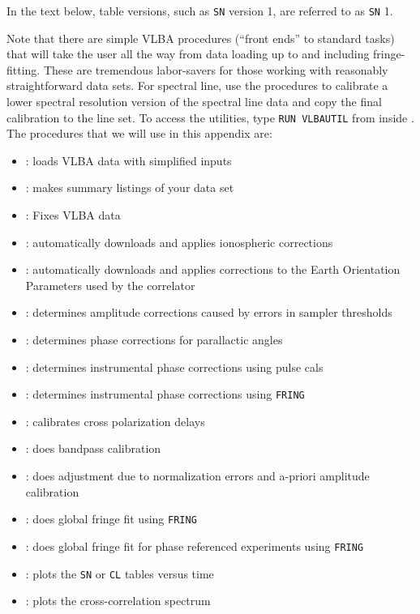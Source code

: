 In the text below, table versions, such as {\tt SN} version 1, are
referred to as {\tt SN} 1.


Note that there are simple VLBA procedures (``front ends'' to standard
tasks) that will take the user all the way from data loading up to and
including fringe-fitting.  These are tremendous labor-savers for those
working with reasonably straightforward data sets.  For spectral line,
use the procedures to calibrate a lower spectral resolution version of
the spectral line data and copy the final calibration to the line set.
To access the utilities, type {\tt RUN VLBAUTIL} from inside \AIPS\@.
The procedures that we will use in this appendix are:

\begin{itemize}
\item {{\tt {}}: loads VLBA data with simplified inputs}
\item {{\tt {}}: makes summary listings of your data set}
\item {{\tt {}}: Fixes VLBA data}
\item {{\tt {}}: automatically downloads and applies ionospheric
           corrections}
\item {{\tt {}}: automatically downloads and applies corrections
           to the Earth Orientation Parameters used by the
           correlator}
\item {{\tt {}}: determines amplitude corrections caused by
           errors in sampler thresholds}
\item {{\tt {}}: determines phase corrections for parallactic
           angles}
\item {{\tt {}}: determines instrumental phase corrections using
           pulse cals}
\item {{\tt {}}: determines instrumental phase corrections using
           {\tt FRING}}
\item {{\tt {}}: calibrates cross polarization delays}
\item {{\tt {}}: does bandpass calibration}
\item {{\tt {}}: does adjustment due to normalization errors and
            a-priori amplitude calibration}
\item {{\tt {}}: does global fringe fit using {\tt FRING}}
\item {{\tt {}}: does global fringe fit for phase referenced
           experiments using {\tt FRING}}
\item {{\tt {}}: plots the {\tt SN} or {\tt CL} tables versus
           time}
\item {{\tt {}}: plots the cross-correlation spectrum}
\end{itemize}

